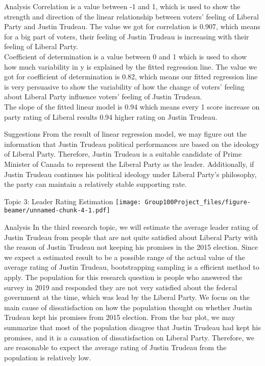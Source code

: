 \documentclass[
  ignorenonframetext,
]{beamer}
\begin{document}
\begin{frame}{Analysis}
\protect\hypertarget{analysis-2}{}
Correlation is a value between -1 and 1, which is used to show the
strength and direction of the linear relationship between voters'
feeling of Liberal Party and Justin Trudeau. The value we got for
correlation is 0.907, which means for a big part of voters, their
feeling of Justin Trudeau is increasing with their feeling of Liberal
Party.\\
Coefficient of determination is a value between 0 and 1 which is used to
show how much variability in y is explained by the fitted regression
line. The value we got for coefficient of determination is 0.82, which
means our fitted regression line is very persuasive to show the
variability of how the change of voters' feeling about Liberal Party
influence voters' feeling of Justin Trudeau.\\
The slope of the fitted linear model is 0.94 which means every 1 score
increase on party rating of Liberal results 0.94 higher rating on Justin
Trudeau.
\end{frame}

\begin{frame}{Suggestions}
\protect\hypertarget{suggestions-1}{}
From the result of linear regression model, we may figure out the
information that Justin Trudeau political performances are based on the
ideology of Liberal Party. Therefore, Justin Trudeau is a suitable
candidate of Prime Minister of Canada to represent the Liberal Party as
the leader. Additionally, if Justin Trudeau continues his political
ideology under Liberal Party's philosophy, the party can maintain a
relatively stable supporting rate.
\end{frame}

\begin{frame}{Topic 3: Leader Rating Estimation}
\protect\hypertarget{topic-3-leader-rating-estimation}{}
\texttt{[image: Group100Project\_files/figure-beamer/unnamed-chunk-4-1.pdf]}
\end{frame}

\begin{frame}{Analysis}
\protect\hypertarget{analysis-3}{}
In the third research topic, we will estimate the average leader rating
of Justin Trudeau from people that are not quite satisfied about Liberal
Party with the reason of Justin Trudeau not keeping his promises in the
2015 election. Since we expect a estimated result to be a possible range
of the actual value of the average rating of Justin Trudeau,
bootstrapping sampling is a efficient method to apply. The population
for this research question is people who answered the survey in 2019 and
responded they are not very satisfied about the federal government at
the time, which was lead by the Liberal Party. We focus on the main
cause of dissatisfaction on how the population thought on whether Justin
Trudeau kept his promises from 2015 election. From the bar plot, we may
summarize that most of the population disagree that Justin Trudeau had
kept his promises, and it is a causation of dissatisfaction on Liberal
Party. Therefore, we are reasonable to expect the average rating of
Justin Trudeau from the population is relatively low.
\end{frame}
\end{document}
